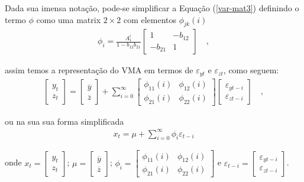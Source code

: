 Dada sua imensa notação, pode-se simplificar a Equação (\ref{var-mat3}) definindo o termo $\phi$ como uma matrix $2 \times 2$ com elementos $\phi_{jk}(i)$
\begin{align}
\phi_i =
\frac{A_{1}^i}{1 - b_{12}b_{21}}
\begin{bmatrix}
    1       & -b_{12} \\
    -b_{21} & 1
\end{bmatrix} \quad,
\end{align}

\noindent assim temos a representação do VMA em termos de {$\varepsilon_{yt}$} e {$\varepsilon_{zt}$}, como seguem:
\begin{align}\label{vma-final}
\begin{bmatrix}
    y_t \\
    z_t
\end{bmatrix}
=
\begin{bmatrix}
    \overline{y} \\
    \overline{z}
\end{bmatrix}
+
\sum_{i=0}^{\infty}
\begin{bmatrix}
    \phi_{11}(i) & \phi_{12}(i) \\
    \phi_{21}(i) & \phi_{22}(i)
\end{bmatrix}
\begin{bmatrix}
    \varepsilon_{yt-i} \\
    \varepsilon_{zt-i}
\end{bmatrix} \quad,
\end{align}

\noindent ou na sua sua forma simplificada
\begin{align} \label{VAR-FIR}
    x_t = \mu + \sum_{i=0}^{\infty} \phi_i \varepsilon_{t-i}
\end{align}

\noindent onde $x_t = \begin{bmatrix} y_t \\ z_t \end{bmatrix}$; $\mu = \begin{bmatrix} \overline{y} \\ \overline{z} \end{bmatrix}$; $\phi_i = \begin{bmatrix} \phi_{11}(i) & \phi_{12}(i) \\ \phi_{21}(i) & \phi_{22}(i) \end{bmatrix}$ e $\varepsilon_{t-i} = \begin{bmatrix} \varepsilon_{yt-i} \\ \varepsilon_{zt-i} \end{bmatrix}$.


